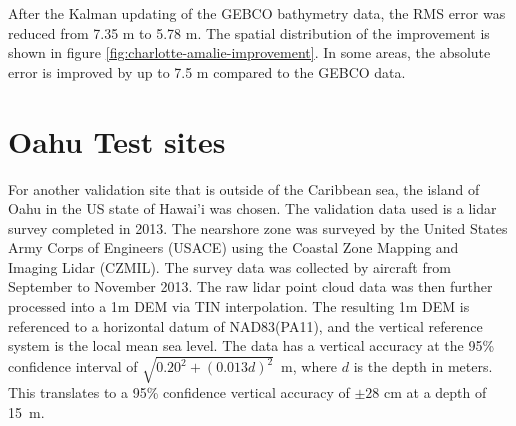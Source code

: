 After the Kalman updating of the GEBCO bathymetry data, the RMS error was reduced from 7.35 m to 5.78 m. The spatial distribution of the improvement is shown in figure \ref{fig:charlotte-amalie-improvement}. In some areas, the absolute error is improved by up to 7.5 m compared to the GEBCO data. 
\begin{figure}[!ht]
    \begin{floatrow}
    \end{floatrow}
\end{figure}





\section{Oahu Test sites}\label{sec:oahuresults}

For another validation site that is outside of the Caribbean sea, the island of Oahu in the US state of Hawai'i was chosen. The validation data used is a lidar survey completed in 2013. The nearshore zone was surveyed by the United States Army Corps of Engineers (USACE) using the Coastal Zone Mapping and Imaging Lidar (CZMIL). The survey data was collected by aircraft from September to November 2013. The raw lidar point cloud data was then further processed into a 1m DEM via TIN interpolation. The resulting 1m DEM is referenced to a horizontal datum of NAD83(PA11), and the vertical reference system is the local mean sea level. The data has a vertical accuracy at the 95\% confidence interval of $\sqrt{0.20^2 + (0.013d)^2}$~m, where $d$ is the depth in meters. This translates to a 95\% confidence vertical accuracy of $\pm 28$ cm at a depth of 15~m.

